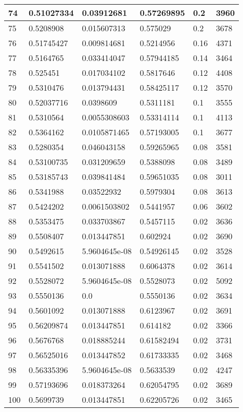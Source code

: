 \begin{longtable}{|l|l|l|l|l|l|}
74 & 0.51027334 & 0.03912681 & 0.57269895 & 0.2 & 3960 \\ \hline 
75 & 0.5208908 & 0.015607313 & 0.575029 & 0.2 & 3678 \\ \hline 
76 & 0.51745427 & 0.009814681 & 0.5214956 & 0.16 & 4371 \\ \hline 
77 & 0.5164765 & 0.033414047 & 0.57944185 & 0.14 & 3464 \\ \hline 
78 & 0.525451 & 0.017034102 & 0.5817646 & 0.12 & 4408 \\ \hline 
79 & 0.5310476 & 0.013794431 & 0.58425117 & 0.12 & 3570 \\ \hline 
80 & 0.52037716 & 0.0398609 & 0.5311181 & 0.1 & 3555 \\ \hline 
81 & 0.5310564 & 0.0055308603 & 0.53314114 & 0.1 & 4113 \\ \hline 
82 & 0.5364162 & 0.0105871465 & 0.57193005 & 0.1 & 3677 \\ \hline 
83 & 0.5280354 & 0.046043158 & 0.59265965 & 0.08 & 3581 \\ \hline 
84 & 0.53100735 & 0.031209659 & 0.5388098 & 0.08 & 3489 \\ \hline 
85 & 0.53185743 & 0.039841484 & 0.59651035 & 0.08 & 3011 \\ \hline 
86 & 0.5341988 & 0.03522932 & 0.5979304 & 0.08 & 3613 \\ \hline 
87 & 0.5424202 & 0.0061503802 & 0.5441957 & 0.06 & 3602 \\ \hline 
88 & 0.5353475 & 0.033703867 & 0.5457115 & 0.02 & 3636 \\ \hline 
89 & 0.5508407 & 0.013447851 & 0.602924 & 0.02 & 3690 \\ \hline 
90 & 0.5492615 & 5.9604645e-08 & 0.54926145 & 0.02 & 3528 \\ \hline 
91 & 0.5541502 & 0.013071888 & 0.6064378 & 0.02 & 3614 \\ \hline 
92 & 0.5528072 & 5.9604645e-08 & 0.5528073 & 0.02 & 5092 \\ \hline 
93 & 0.5550136 & 0.0 & 0.5550136 & 0.02 & 3634 \\ \hline 
94 & 0.5601092 & 0.013071888 & 0.6123967 & 0.02 & 3691 \\ \hline 
95 & 0.56209874 & 0.013447851 & 0.614182 & 0.02 & 3366 \\ \hline 
96 & 0.5676768 & 0.018885244 & 0.61582494 & 0.02 & 3731 \\ \hline 
97 & 0.56525016 & 0.013447852 & 0.61733335 & 0.02 & 3468 \\ \hline 
98 & 0.56335396 & 5.9604645e-08 & 0.5633539 & 0.02 & 4247 \\ \hline 
99 & 0.57193696 & 0.018373264 & 0.62054795 & 0.02 & 3689 \\ \hline 
100 & 0.5699739 & 0.013447851 & 0.62205726 & 0.02 & 3465 \\ \hline 
\end{longtable}